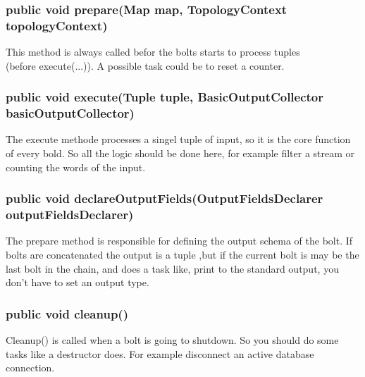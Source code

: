 \subsubsection{public void prepare(Map map, TopologyContext topologyContext)}
This method is always called befor the bolts starts to process tuples\\ (before execute(...)).
A possible task could be to reset a counter.


\subsubsection{public void execute(Tuple tuple, BasicOutputCollector basicOutputCollector)}
The execute methode processes a singel tuple of input, so it is the core function of every bold.
So all the logic should be done here, for example filter a stream or counting the words of the input.

\subsubsection{public void declareOutputFields(OutputFieldsDeclarer outputFieldsDeclarer)}
The prepare method is responsible for defining the output schema of the bolt.
If bolts are concatenated the output is a tuple ,but if the current bolt is may be the last bolt in the chain,
and does a task like, print to the standard output, you don't have to set an output type.

\subsubsection{public void cleanup()}
Cleanup() is called when a bolt is going to shutdown. So you should do some tasks like a destructor does.
For example disconnect an active database connection.
